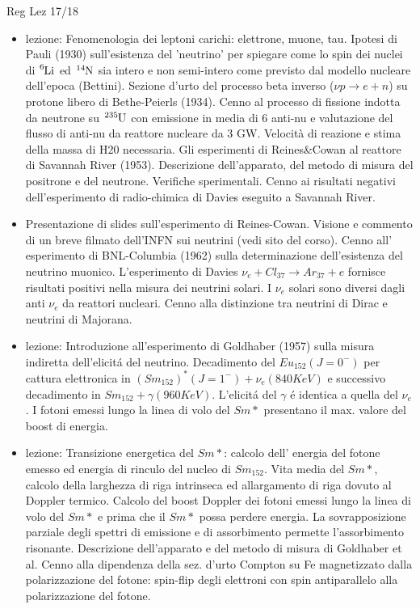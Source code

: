 \begin{frame}[allowframebreaks]{Reg Lez 17/18}
\begin{itemize}
\item  lezione: Fenomenologia dei leptoni carichi: elettrone, muone, tau. Ipotesi di Pauli (1930) sull'esistenza del 'neutrino' per spiegare come lo spin dei nuclei di $\cel{Li}{6}{}{}$ ed $\cel{N}{14}{}{}$ sia intero e non semi-intero come previsto dal modello nucleare dell'epoca (Bettini). Sezione d'urto del processo beta inverso ($\nu p\to e+n$) su protone libero di Bethe-Peierls (1934). Cenno al processo di fissione indotta da neutrone su $\cel{U}{235}{}{}$ con emissione in media di 6 anti-nu e valutazione del flusso di anti-nu da reattore nucleare da 3 GW. Velocità di reazione e stima della massa di H20 necessaria. Gli esperimenti di Reines\&Cowan al reattore di Savannah River (1953). Descrizione dell'apparato, del metodo di misura del positrone e del neutrone. Verifiche sperimentali. Cenno ai risultati negativi dell'esperimento di radio-chimica di Davies eseguito a Savannah River.

\item  Presentazione di slides sull'esperimento di Reines-Cowan. Visione e commento di un breve filmato dell'INFN sui neutrini (vedi sito del corso). Cenno all' esperimento di BNL-Columbia (1962) sulla determinazione dell'esistenza del neutrino muonico. L'esperimento di Davies $\nu_e+Cl_{37}\to Ar_{37}+e$ fornisce risultati positivi nella misura dei neutrini solari. I $\nu_e$ solari sono diversi dagli anti $\nu_e$ da reattori nucleari. Cenno alla distinzione tra neutrini di Dirac e neutrini di Majorana.

\item  lezione: Introduzione all'esperimento di Goldhaber (1957) sulla misura indiretta dell'elicit\'a del neutrino. Decadimento del $Eu_{152}(J=0^-)$ per cattura elettronica in $(Sm_{152})^*(J=1^-)+\nu_e(840KeV)$ e successivo decadimento in $Sm_{152}+\gamma(960KeV)$. L'elicit\'a del $\gamma$ \'e identica a quella del $\nu_e$. I fotoni emessi lungo la linea di volo del $Sm*$ presentano il max. valore del boost di energia.

\item  lezione: Transizione energetica del $Sm*$: calcolo dell' energia del fotone emesso ed energia di rinculo del nucleo di $Sm_{152}$. Vita media del $Sm*$, calcolo della larghezza di riga intrinseca ed allargamento di riga dovuto al Doppler termico. Calcolo del boost Doppler dei fotoni emessi lungo la linea di volo del $Sm*$ e prima che il $Sm*$ possa perdere energia. La sovrapposizione parziale degli spettri di emissione e di assorbimento permette l'assorbimento risonante. Descrizione dell'apparato e del metodo di misura di Goldhaber et al. Cenno alla dipendenza della sez. d'urto Compton su Fe magnetizzato dalla polarizzazione del fotone: spin-flip degli elettroni con spin antiparallelo alla polarizzazione del fotone.


\end{itemize}
\end{frame}
